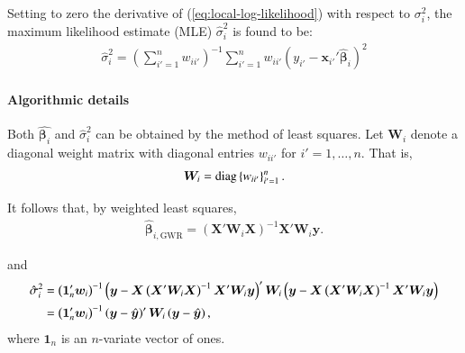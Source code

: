 \documentclass[authoryear, review, 11pt]{elsarticle}
\begin{document}
	 Setting to zero the derivative of (\ref{eq:local-log-likelihood}) with respect to $\sigma_i^2$, the maximum likelihood estimate (MLE) $\hat{\sigma}_i^2$ is found to be:	 
	 \begin{align}
	 	\hat{\sigma}_i^2 = \left(\sum \limits_{i'=1}^{n} w_{ii'} \right)^{-1} \sum \limits_{i'=1}^n w_{ii'}\left(y_{i'} - \bm{x}_{i'}'\hat{\bm{\beta}}_i\right)^2
	\end{align}
	
	\paragraph{Algorithmic details} Both $\hat{\bm{\beta}_i}$ and $\hat{\sigma}_i^2$ can be obtained by the method of least squares. Let $\bm{W}_i$ denote a diagonal weight matrix with diagonal entries $w_{ii'}$ for $i'=1, \dots, n$. That is,
	\begin{align}
		\bm{W}_i =  {\rm diag}\left\{w_{ii'}\right\}_{i' = 1}^n.
	\end{align}
	
	It follows that, by weighted least squares,
	\begin{align}
		\hat{\bm{\beta}}_{i, \text{GWR}} = \left( \bm{X}'\bm{W}_i\bm{X} \right)^{-1} \bm{X}'\bm{W}_i\bm{y}.
	\end{align}
	
	and
	\begin{align}
		\hat{\sigma}^2_i &= \left(\bm{1}_n'\bm{w}_i \right)^{-1} \left(\bm{y}-\bm{X}\left(\bm{X}'\bm{W}_i\bm{X}\right)^{-1}\bm{X}'\bm{W}_i\bm{y}\right)' \bm{W}_i \left(\bm{y}-\bm{X}\left(\bm{X}'\bm{W}_i\bm{X}\right)^{-1}\bm{X}'\bm{W}_i\bm{y}\right) \notag \\
		&= \left(\bm{1}_n'\bm{w}_i \right)^{-1}  \left(\bm{y}-\hat{\bm{y}}\right)' \bm{W}_i \left(\bm{y}-\hat{\bm{y}}\right),
	\end{align}	
	where $\bm{1}_n$ is an $n$-variate vector of ones.
		
\end{document}
